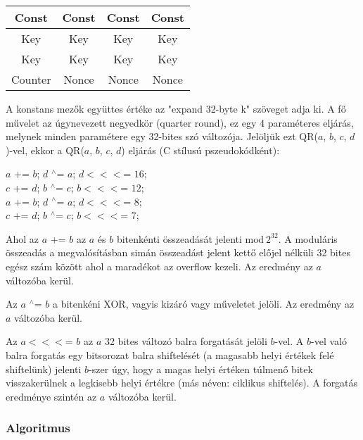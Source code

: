 \documentclass[12pt]{article}
\begin{document}
	\begin{table}[h]
		\centering
		\begin{tabular}{|c|c|c|c|}
			\hline
			\rowcolor{yellow}Const&Const&Const&Const\\\hline
			\rowcolor[rgb]{0.04313,0.7137,1} Key&Key&Key&Key\\\hline
			\rowcolor[rgb]{0.04313,0.7137,1} Key&Key&Key&Key\\\hline
			\cellcolor[rgb]{1,0.3686,0.3686}Counter& \cellcolor[rgb]{0,1, 0.26}Nonce&\cellcolor[rgb]{0,1, 0.26}Nonce&\cellcolor[rgb]{0,1, 0.26}Nonce\\\hline
		\end{tabular}
	\end{table}

	A konstans mezők együttes értéke az "expand 32-byte k" szöveget adja ki. A fő művelet az úgynevezett negyedkör (quarter round), ez egy 4 paraméteres eljárás, melynek minden paramétere egy 32-bites szó változója. Jelöljük ezt QR($a$, $b$, $c$, $d$)-vel, ekkor a QR($a$, $b$, $c$, $d$) eljárás (C stílusú pszeudokódként):
	\begin{center}
	$a$ += $b$; $d$ $^\wedge$= $a$; $d <<<$= $16$; \\
	$c$ += $d$; $b$ $^\wedge$= $c$; $b <<<$= $12$; \\
	$a$ += $b$; $d$ $^\wedge$= $a$; $d <<<$= $8$; \\
	$c$ += $d$; $b$ $^\wedge$= $c$; $b <<<$= $7$;
	\end{center}
	Ahol az $a$ += $b$ az $a$ és $b$ bitenkénti összeadását jelenti $\textrm{mod}\ 2^{32}$. A moduláris összeadás a megvalósításban simán összeadást jelent kettő előjel nélküli 32 bites egész szám között ahol a maradékot az overflow kezeli. Az eredmény az $a$ változóba kerül.
	
	Az $a$ $^\wedge$= $b$ a bitenkéni XOR, vagyis kizáró vagy műveletet jelöli. Az eredmény az $a$ változóba kerül.
	
	Az $a <<<$= $b$ az $a$ 32 bites változó balra forgatását jelöli $b$-vel. A $b$-vel való balra forgatás egy bitsorozat balra shiftelését (a magasabb helyi értékek felé shiftelünk) jelenti $b$-szer úgy, hogy a magas helyi értéken túlmenő bitek visszakerülnek a legkisebb helyi értékre (más néven: ciklikus shiftelés). A forgatás eredménye szintén az $a$ változóba kerül.
	\subsubsection*{Algoritmus}
	
\end{document}
